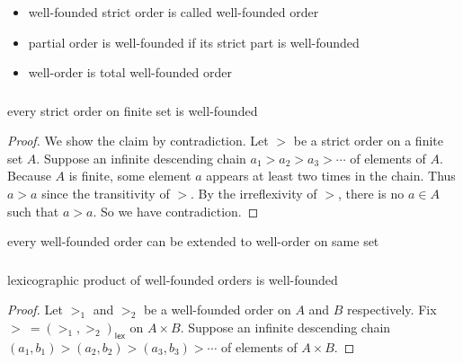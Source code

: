 \documentclass[12pt,aspectratio=169]{beamer}
\begin{document}
\begin{frame}
    \frametitle{}
    \begin{definition}
        \begin{itemize}
            \item well-founded strict order is called \alert{well-founded order}
            \item partial order is \alert{well-founded} if its strict part is well-founded
            \item \alert{well-order} is total well-founded order
        \end{itemize}
    \end{definition}
\end{frame}

\begin{frame}
    \frametitle{}
    \begin{lemma}
        every strict order on finite set is well-founded
    \end{lemma}

    \begin{proof}
        We show the claim by contradiction.
        Let $>$ be a strict order on a finite set $A$.
        Suppose an infinite descending chain $a_1 > a_2 > a_3 > \cdots$
        of elements of $A$.
        Because $A$ is finite, some element $a$ appears at least two times in the chain. Thus $a > a$ since the transitivity of $>$.
        By the irreflexivity of $>$, there is no $a \in A$ such that $a > a$. So we have contradiction.
    \end{proof}

    \begin{theorem}
        every well-founded order can be extended to well-order on same set
    \end{theorem}
\end{frame}

\begin{frame}
    \frametitle{}
    \begin{theorem}
        lexicographic product of well-founded orders is well-founded
    \end{theorem}

    \begin{proof}
        Let $>_1$ and $>_2$ be a well-founded order on $A$ and $B$ respectively. Fix $> \: = (>_1,>_2)_{\mathsf{lex}}$ on $A \times B$.
        Suppose an infinite descending chain $(a_1, b_1) > (a_2, b_2) > (a_3, b_3) > \cdots$ of elements of $A \times B$.
    \end{proof}
\end{frame}
\end{document}
